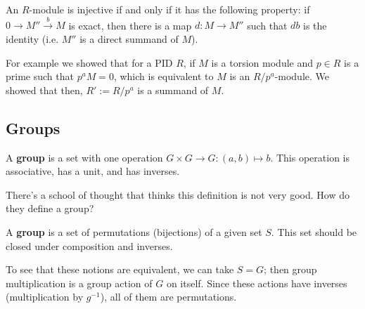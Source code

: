 \begin{theorem}
    An $R$-module is injective if and only if it has the following property:
    if $0 \to M'' \xrightarrow{b} M$ is exact, then there is a map $d: M \to M''$ such that $db$ is the identity (i.e. $M''$ is a direct summand of $M$).
\end{theorem}

For example we showed that for a PID $R$,
if $M$ is a torsion module and $p \in R$ is a prime
such that $p^a M = 0$, which is equivalent to $M$ is an $R/p^a$-module.
We showed that then, $R' := R/p^a$ is a summand of $M$.

\subsection{Groups}
\begin{definition}
    A \textbf{group} is a set with one operation $G \times G \to G: (a, b) \mapsto b$.
    This operation is associative, has a unit, and has inverses.
\end{definition}
There's a school of thought that thinks this definition is not very good. How do they define a group?
\begin{definition}
    A \textbf{group} is a set of permutations (bijections) of a given set $S$.
    This set should be closed under composition and inverses.
\end{definition}
To see that these notions are equivalent, we can take $S = G$; then group multiplication is a group
action of $G$ on itself.
Since these actions have inverses (multiplication by $g^{-1}$),
all of them are permutations.

